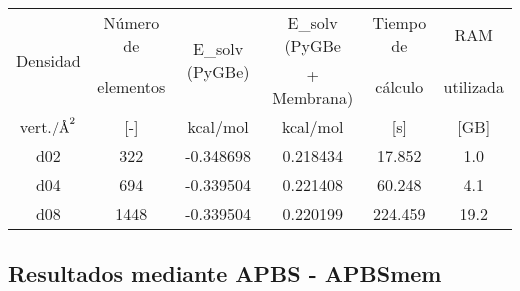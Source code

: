 \documentclass[12pt, oneside, numbers, spanish]{ezthesis}
\numberwithin{equation}{section}
\newcommand{\angstrom}{\text{\normalfont\AA}}
\begin{document}
\begin{table}[H]
	\centering
	\caption{}
	\def\arraystretch{0.8}
	\begin{tabular}{|cccccc|}\hline
		\multirow{2}{*}{Densidad} & Número de & \multirow{2}{*}{E\_solv (PyGBe)} & E\_solv (PyGBe & Tiempo de & RAM\\
		& elementos &  & + Membrana) & cálculo & utilizada\\\hline
		\rule{0pt}{15pt} vert.$/\angstrom^2$ & [-] & kcal/mol & kcal/mol & [s] & [GB] \\\hline
		d02 & 322 & -0.348698 & 0.218434 & 17.852 & 1.0\\
		d04 & 694 & -0.339504 & 0.221408 & 60.248 & 4.1\\
		d08 & 1448 & -0.339504 & 0.220199 & 224.459 & 19.2\\ \hline
	\end{tabular}\label{table:pygbe_bromoethane}
\end{table}


\subsection{Resultados mediante APBS - APBSmem}\label{resultados_apbs}
\end{document}
